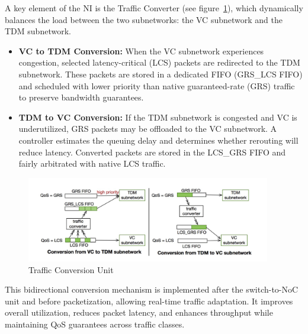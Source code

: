 A key element of the NI is the Traffic Converter (see figure~\ref{fig:traffic_conversion_unit}), which dynamically balances the load between the two subnetworks: the \ac{VC} subnetwork and the \ac{TDM} subnetwork.

\begin{itemize}
    \item \textbf{VC to TDM Conversion:} When the VC subnetwork experiences congestion, selected latency-critical (LCS) packets are redirected to the TDM subnetwork. These packets are stored in a dedicated FIFO (GRS\_LCS FIFO) and scheduled with lower priority than native guaranteed-rate (GRS) traffic to preserve bandwidth guarantees.
    \item \textbf{TDM to VC Conversion:} If the TDM subnetwork is congested and VC is underutilized, GRS packets may be offloaded to the VC subnetwork. A controller estimates the queuing delay and determines whether rerouting will reduce latency. Converted packets are stored in the LCS\_GRS FIFO and fairly arbitrated with native LCS traffic.
\end{itemize}

\begin{figure}[htbp]
    \centering
    \includegraphics[width=0.95\textwidth]{paper/img/Traffic-Conversion-Uni.png}
    \caption{Traffic Conversion Unit}
    \label{fig:traffic_conversion_unit}
\end{figure}

This bidirectional conversion mechanism is implemented after the switch-to-NoC unit and before packetization, allowing real-time traffic adaptation. It improves overall utilization, reduces packet latency, and enhances throughput while maintaining QoS guarantees across traffic classes.

